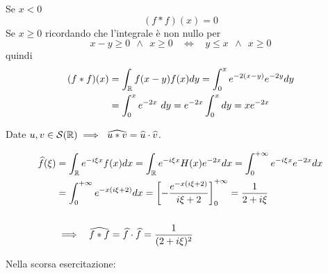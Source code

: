 Se $x< 0$
\begin{equation*}
( f*f)( x) =0
\end{equation*}
Se $x\geqslant 0$ ricordando che l'integrale è non nullo per 
\begin{equation*}
x-y\geqslant 0\ \ \land \ \ x\geqslant 0\ \ \ \ \iff \ \ \ \ y\leqslant x\ \ \land \ \ x\geqslant 0
\end{equation*}
quindi
\begin{align*}
( f*f)( x) & =\int _{\mathbb{R} } f( x-y) f( x) dy=\int ^{x}_{0} e^{-2( x-y)} e^{-2y} dy\\
 & =\int ^{x}_{0} e^{-2x} \ dy=e^{-2x}\int ^{x}_{0} dy=xe^{-2x}
\end{align*}
\begin{thm}
Date $\displaystyle u,v\in \mathcal{S} (\mathbb{R} ) \implies \ \widehat{u*v} =\widehat{u} \cdot \widehat{v}$.
\end{thm}
\begin{align*}
\widehat{f}( \xi ) & =\int _{\mathbb{R} } e^{-i\xi x} f( x) dx=\int _{\mathbb{R} } e^{-i\xi x} H( x) e^{-2x} dx=\int ^{+\infty }_{0} e^{-i\xi x} e^{-2x} dx\\
 & =\int ^{+\infty }_{0} e^{-x( i\xi +2)} dx=\left[ -\frac{e^{-x( i\xi +2)}}{i\xi +2}\right]^{+\infty }_{0} =\frac{1}{2+i\xi }\\
 & \\
 & \implies \ \ \widehat{f*f} =\widehat{f} \cdot \widehat{f} =\frac{1}{( 2+i\xi )^{2}}
\end{align*}
\Soluzione

Nella scorsa esercitazione:

